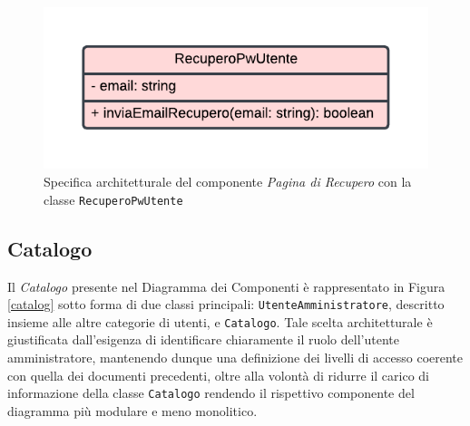 \documentclass[11pt, a4paper]{article}
\theoremstyle{definition} %
\begin{document}
\begin{figure}[H]
\centering
\includegraphics[scale = 0.85]{materiale/class-recupero.pdf}
\caption{Specifica architetturale del componente \textit{Pagina di Recupero} con la classe \texttt{RecuperoPwUtente}}
\label{recupero}
\end{figure}



\newpage
\subsection{Catalogo}
Il \textit{Catalogo} presente nel Diagramma dei Componenti è rappresentato in
Figura \ref{catalog} sotto forma di due classi principali: \texttt{UtenteAmministratore}, descritto insieme
alle altre categorie di utenti, e \texttt{Catalogo}. Tale scelta architetturale
è giustificata dall'esigenza di identificare chiaramente il ruolo dell'utente
amministratore, mantenendo dunque una definizione dei livelli di accesso
coerente con quella dei documenti precedenti, oltre alla volontà di ridurre il
carico di informazione della classe \texttt{Catalogo} rendendo il rispettivo
componente del diagramma più modulare e meno monolitico.
\end{document}
